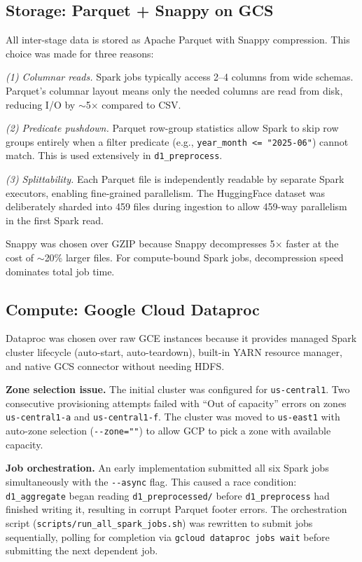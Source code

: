 \documentclass[conference]{IEEEtran}
\begin{document}
\subsection{Storage: Parquet + Snappy on GCS}

All inter-stage data is stored as Apache Parquet with Snappy compression.
This choice was made for three reasons:

\textit{(1) Columnar reads.} Spark jobs typically access 2--4 columns from
wide schemas. Parquet's columnar layout means only the needed columns are
read from disk, reducing I/O by $\sim$5$\times$ compared to CSV.

\textit{(2) Predicate pushdown.} Parquet row-group statistics allow Spark to
skip row groups entirely when a filter predicate (e.g., \texttt{year\_month
<= "2025-06"}) cannot match. This is used extensively in \texttt{d1\_preprocess}.

\textit{(3) Splittability.} Each Parquet file is independently readable by
separate Spark executors, enabling fine-grained parallelism. The
HuggingFace dataset was deliberately sharded into 459 files during ingestion
to allow 459-way parallelism in the first Spark read.

Snappy was chosen over GZIP because Snappy decompresses 5$\times$ faster at
the cost of $\sim$20\% larger files. For compute-bound Spark jobs, decompression
speed dominates total job time.

\subsection{Compute: Google Cloud Dataproc}

Dataproc was chosen over raw GCE instances because it provides managed Spark
cluster lifecycle (auto-start, auto-teardown), built-in YARN resource manager,
and native GCS connector without needing HDFS.

\textbf{Zone selection issue.} The initial cluster was configured for
\texttt{us-central1}. Two consecutive provisioning attempts failed with
``Out of capacity'' errors on zones \texttt{us-central1-a} and
\texttt{us-central1-f}. The cluster was moved to \texttt{us-east1} with
auto-zone selection (\texttt{-{}-zone=""}) to allow GCP to pick a zone
with available capacity.

\textbf{Job orchestration.} An early implementation submitted all six Spark
jobs simultaneously with the \texttt{-{}-async} flag. This caused a race
condition: \texttt{d1\_aggregate} began reading \texttt{d1\_preprocessed/}
before \texttt{d1\_preprocess} had finished writing it, resulting in corrupt
Parquet footer errors. The orchestration script
(\texttt{scripts/run\_all\_spark\_jobs.sh}) was rewritten to submit jobs
sequentially, polling for completion via \texttt{gcloud dataproc jobs wait}
before submitting the next dependent job.
\end{document}
